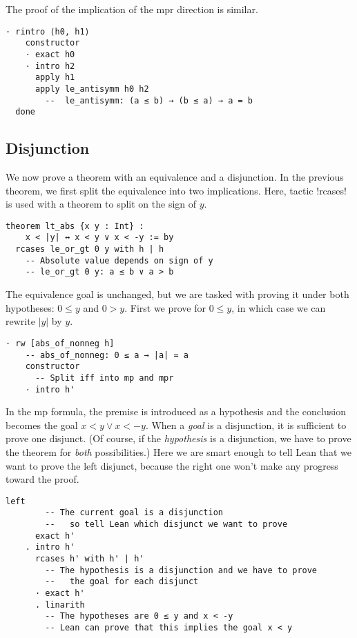 The proof of the implication of the mpr direction is similar.
\begin{Verbatim}[firstnumber=last]
  · rintro ⟨h0, h1⟩
    constructor
    · exact h0
    · intro h2
      apply h1
      apply le_antisymm h0 h2
        --  le_antisymm: (a ≤ b) → (b ≤ a) → a = b
  done
\end{Verbatim}


\subsection{Disjunction}

We now prove a theorem with an equivalence and a disjunction. In the previous theorem, we first split the equivalence into two implications. Here, tactic !rcases! is used with a theorem to split on the sign of $y$. \begin{Verbatim}
theorem lt_abs {x y : Int} :
    x < |y| ↔ x < y ∨ x < -y := by
  rcases le_or_gt 0 y with h | h
    -- Absolute value depends on sign of y
    -- le_or_gt 0 y: a ≤ b ∨ a > b
\end{Verbatim}

The equivalence goal is unchanged, but we are tasked with proving it under both hypotheses: $0\leq y$ and $0>y$. First we prove for $0\leq y$, in which case we can rewrite $|y|$ by $y$.
\begin{Verbatim}[firstnumber=last]
  · rw [abs_of_nonneg h]
    -- abs_of_nonneg: 0 ≤ a → |a| = a
    constructor
      -- Split iff into mp and mpr
    · intro h'
\end{Verbatim}
In the mp formula, the premise is introduced as a hypothesis and the  conclusion becomes the goal $x < y \vee x < -y$. When a \emph{goal} is a disjunction, it is sufficient to prove one disjunct. (Of course, if the \emph{hypothesis} is a disjunction, we have to prove the theorem for \emph{both} possibilities.) Here we are smart enough to tell Lean that we want to prove the left disjunct, because the right one won't make any progress toward the proof.
\begin{Verbatim}[firstnumber=last]
      left
        -- The current goal is a disjunction
        --   so tell Lean which disjunct we want to prove
      exact h'
    . intro h'
      rcases h' with h' | h'
        -- The hypothesis is a disjunction and we have to prove
        --   the goal for each disjunct
      · exact h'
      . linarith
        -- The hypotheses are 0 ≤ y and x < -y
        -- Lean can prove that this implies the goal x < y
\end{Verbatim}

